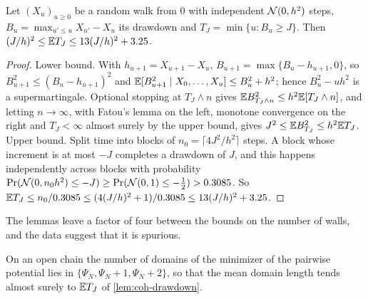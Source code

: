 \begin{lemma}\label{lem:coh-drawdown}
Let $(X_u)_{u\ge0}$ be a random walk from $0$ with independent $\mathcal{N}(0,h^2)$ steps, $B_u=\max_{u'\le u}X_{u'}-X_u$ its drawdown and $T_J=\min\{u:B_u\ge J\}$. Then $(J/h)^2\le\mathbb{E} T_J\le13(J/h)^2+3.25$.
\end{lemma}

\begin{proof}
Lower bound. With $h_{u+1}=X_{u+1}-X_u$, $B_{u+1}=\max\{B_u-h_{u+1},0\}$, so $B_{u+1}^2\le(B_u-h_{u+1})^2$ and $\mathbb{E}[B_{u+1}^2\mid X_0,\dots,X_u]\le B_u^2+h^2$; hence $B_u^2-uh^2$ is a supermartingale. Optional stopping at $T_J\wedge n$ gives $\mathbb{E} B^2_{T_J\wedge n}\le h^2\mathbb{E}[T_J\wedge n]$, and letting $n\to\infty$, with Fatou's lemma on the left, monotone convergence on the right and $T_J<\infty$ almost surely by the upper bound, gives $J^2\le\mathbb{E} B_{T_J}^2\le h^2\mathbb{E} T_J$. Upper bound. Split time into blocks of $n_0=\lceil4J^2/h^2\rceil$ steps. A block whose increment is at most $-J$ completes a drawdown of $J$, and this happens independently across blocks with probability $\Pr(\mathcal{N}(0,n_0h^2)\le-J)\ge\Pr(\mathcal{N}(0,1)\le-\frac12)>0.3085$. So $\mathbb{E} T_J\le n_0/0.3085\le(4(J/h)^2+1)/0.3085\le13(J/h)^2+3.25$.
\end{proof}

The lemmas leave a factor of four between the bounds on the number of walls, and the data suggest that it is spurious.

\begin{conjecture}\label{conj:coh-walls}
On an open chain the number of domains of the minimizer of the pairwise potential lies in $\{\Psi_N,\Psi_N+1,\Psi_N+2\}$, so that the mean domain length tends almost surely to $\mathbb{E} T_J$ of \cref{lem:coh-drawdown}.
\end{conjecture}

